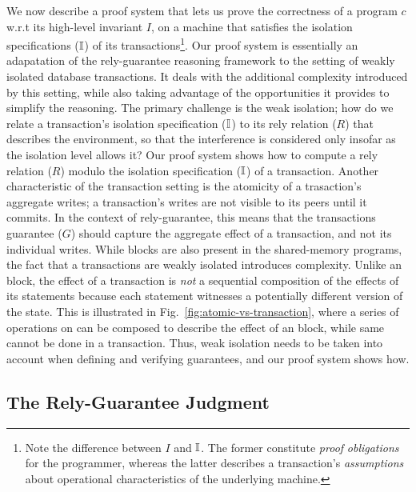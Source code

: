 We now describe a proof system that lets us prove the correctness of a \txnimp
program $c$ w.r.t its high-level invariant $I$, on a machine that
satisfies the isolation specifications ($\mathbb{I}$) of its
transactions\footnote{Note the difference between $I$ and $\mathbb{I}$. The
former constitute \emph{proof} \emph{obligations} for the programmer,
whereas the latter describes a transaction's \emph{assumptions} about
operational characteristics of the underlying machine.}.  Our proof
system is essentially an adapatation of the rely-guarantee reasoning
framework to the setting of weakly isolated database transactions. It
deals with the additional complexity introduced by this setting, while
also taking advantage of the opportunities it provides to simplify the
reasoning. The primary challenge is the weak isolation; how do we
relate a transaction's isolation specification ($\mathbb{I}$) to its rely
relation ($R$) that describes the environment, so that the
interference is considered only insofar as the isolation level allows
it? Our proof system shows how to compute a rely relation ($R$) modulo
the isolation specification ($\mathbb{I}$) of a transaction. Another
characteristic of the transaction setting is the atomicity of a
trasaction's aggregate writes; a transaction's writes are not visible
to its peers until it commits. In the context of rely-guarantee, this
means that the transactions guarantee ($G$) should capture the
aggregate effect of a transaction, and not its individual writes.
While  blocks are also present in the shared-memory
programs, the fact that a transactions are weakly isolated introduces
complexity.  Unlike an  block, the effect of a transaction
is \emph{not} a sequential composition of the effects of its
statements because each statement witnesses a potentially different
version of the state. This is illustrated in
Fig.~\ref{fig:atomic-vs-transaction}, where a series of operations on
 can be composed to describe the effect of an  block,
while same cannot be done in a transaction. Thus, weak isolation needs
to be taken into account when defining and verifying guarantees, and
our proof system shows how. 

\subsection{The Rely-Guarantee Judgment}
\label{sec:rely-guarantee}




